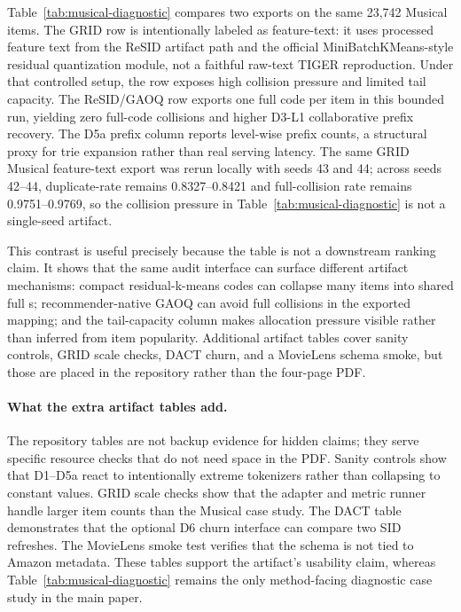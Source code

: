 Table~\ref{tab:musical-diagnostic} compares two exports on the same 23,742
Musical items. The GRID row is intentionally labeled as feature-text: it uses
processed feature text from the ReSID artifact path and the official
MiniBatchKMeans-style residual quantization module, not a faithful raw-text
TIGER reproduction. Under that controlled setup, the row exposes high collision
pressure and limited tail capacity. The ReSID/GAOQ row exports one full code
per item in this bounded run, yielding zero full-code collisions and higher
D3-L1 collaborative prefix recovery. The D5a prefix column reports level-wise
prefix counts, a structural proxy for trie expansion rather than real serving
latency.
The same GRID Musical feature-text export was rerun locally with seeds 43 and
44; across seeds 42--44, duplicate-\sid rate remains 0.8327--0.8421 and
full-collision rate remains 0.9751--0.9769, so the collision pressure in
Table~\ref{tab:musical-diagnostic} is not a single-seed artifact.

This contrast is useful precisely because the table is not a downstream
ranking claim. It shows that the same audit interface can surface different
artifact mechanisms: compact residual-k-means codes can collapse many items
into shared full \sid{}s; recommender-native GAOQ can avoid full collisions in
the exported mapping; and the tail-capacity column makes allocation pressure
visible rather than inferred from item popularity. Additional artifact tables
cover sanity controls, GRID scale checks, DACT churn, and a MovieLens schema
smoke, but those are placed in the repository rather than the four-page PDF.

\paragraph{What the extra artifact tables add.}
The repository tables are not backup evidence for hidden claims; they serve
specific resource checks that do not need space in the PDF. Sanity controls
show that D1--D5a react to intentionally extreme tokenizers rather than
collapsing to constant values. GRID scale checks show that the adapter and
metric runner handle larger item counts than the Musical case study. The DACT
table demonstrates that the optional D6 churn interface can compare two SID
refreshes. The MovieLens smoke test verifies that the schema is not tied to
Amazon metadata. These tables support the artifact's usability claim, whereas
Table~\ref{tab:musical-diagnostic} remains the only method-facing diagnostic
case study in the main paper.
